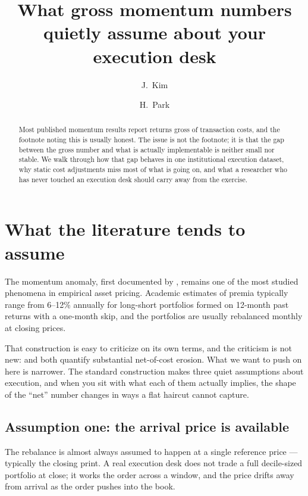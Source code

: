 \documentclass{scc}
\title{What gross momentum numbers quietly assume about your execution desk}
\author{J.~Kim \and H.~Park}
\begin{document}
\maketitle

\begin{abstract}
Most published momentum results report returns gross of transaction costs, and the footnote noting this is usually honest. The issue is not the footnote; it is that the gap between the gross number and what is actually implementable is neither small nor stable. We walk through how that gap behaves in one institutional execution dataset, why static cost adjustments miss most of what is going on, and what a researcher who has never touched an execution desk should carry away from the exercise.
\end{abstract}

\section{What the literature tends to assume}

The momentum anomaly, first documented by \citet{jegadeesh1993}, remains one of the most studied phenomena in empirical asset pricing. Academic estimates of premia typically range from 6--12\% annually for long-short portfolios formed on 12-month past returns with a one-month skip, and the portfolios are usually rebalanced monthly at closing prices.

That construction is easy to criticize on its own terms, and the criticism is not new: \citet{novy2012} and \citet{frazzini2014} both quantify substantial net-of-cost erosion. What we want to push on here is narrower. The standard construction makes three quiet assumptions about execution, and when you sit with what each of them actually implies, the shape of the ``net'' number changes in ways a flat haircut cannot capture.

\subsection{Assumption one: the arrival price is available}
The rebalance is almost always assumed to happen at a single reference price --- typically the closing print. A real execution desk does not trade a full decile-sized portfolio at close; it works the order across a window, and the price drifts away from arrival as the order pushes into the book.
\end{document}
